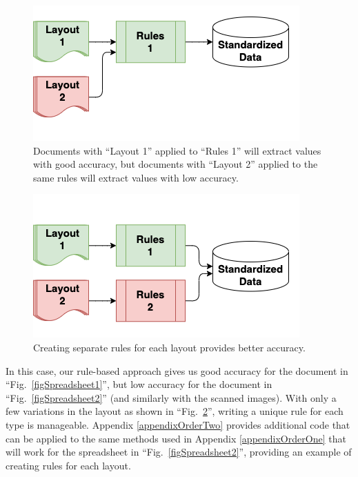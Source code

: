 \documentclass[conference]{IEEEtran}
\begin{document}
\begin{figure}[ht]
\centerline{\includegraphics[width=\columnwidth]{RulesFlow2a.png}}
\caption{Documents with ``Layout 1'' applied to ``Rules 1'' will extract values with good accuracy, but documents with ``Layout 2'' applied to the same rules will extract values with low accuracy.}
\label{figRulesFlow2a}
\end{figure}

\begin{figure}[ht]
\centerline{\includegraphics[width=\columnwidth]{RulesFlow2b.png}}
\caption{Creating separate rules for each layout provides better accuracy.}
\label{figRulesFlow2b}
\end{figure}

In this case, our rule-based approach gives us good accuracy for the document in ``Fig.~\ref{figSpreadsheet1}'', but low accuracy for the document in ``Fig.~\ref{figSpreadsheet2}'' (and similarly with the scanned images). With only a few variations in the layout as shown in ``Fig.~\ref{figRulesFlow2b}'', writing a unique rule for each type is manageable. Appendix \ref{appendixOrderTwo} provides additional code that can be applied to the same methods used in Appendix \ref{appendixOrderOne} that will work for the spreadsheet in ``Fig.~\ref{figSpreadsheet2}'', providing an example of creating rules for each layout.
\end{document}
